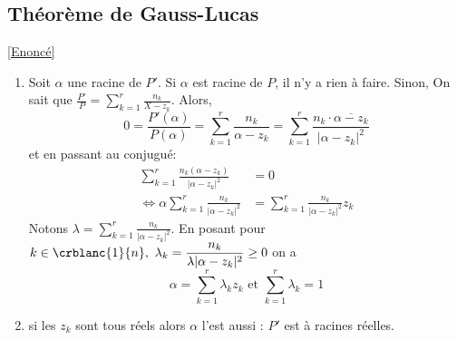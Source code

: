 \documentclass{book}
\begin{document}
	\subsection{Théorème de Gauss-Lucas }
	\label{sec:theoreme-de-gauss-lucas-etoile2}
	\textcolor{blue}{\hyperref[gausslucas]{[Enoncé]}}\\
	\label{Gauss-Lucas}
	\begin{enumerate}
		\item Soit $\alpha$ une racine de $P'$. Si $\alpha$ est racine de $P$, il n'y a rien à faire. Sinon, On sait que $\displaystyle\frac{P'}{P}=\sum\limits_{k=1}^r{\frac{n_k}{X-z_k}}$. Alors,
		$$0=\frac{P'(\alpha)}{P(\alpha)}=\sum\limits_{k=1}^r{\frac{n_k}{\alpha-z_k}}=\sum\limits_{k=1}^r{\frac{n_k\cdot\overline{\alpha-z_k}}{|\alpha-z_k|^2}}$$
		et en passant au conjugué:
		\begin{align*}
			\sum\limits_{k=1}^r{\frac{n_k(\alpha-z_k)}{|\alpha-z_k|^2}}&=0\\
			\iff \alpha\sum\limits_{k=1}^r{\frac{n_k}{|\alpha-z_k|^2}}&=\sum\limits_{k=1}^r{\frac{n_k}{|\alpha-z_k|^2}z_k}
		\end{align*}
		Notons $\lambda=\displaystyle\sum\limits_{k=1}^r{\frac{n_k}{|\alpha-z_k|^2}}$. En posant pour $k\in \crblanc{1}{n},\ \lambda_k=\displaystyle\frac{n_k}{\lambda|\alpha-z_k|^2}\geq 0$ on a
		$$\alpha=\sum\limits_{k=1}^r{\lambda_kz_k}\text{ et } \sum\limits_{k=1}^r{\lambda_k}=1$$
		\item si les $z_k$ sont tous réels alors $\alpha$ l'est aussi : $P'$ est à racines réelles.
	\end{enumerate}
	
\end{document}
